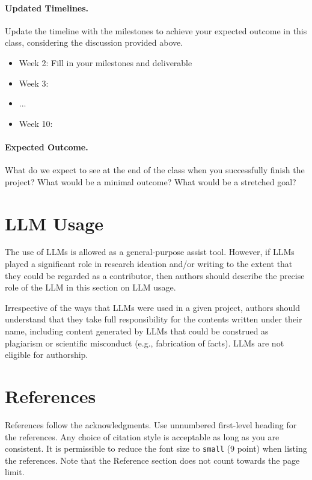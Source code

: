 \documentclass{article}
\newcommand{\new}[1]{{\color{red} #1}}
\begin{document}
\new{
\paragraph{Updated Timelines.}
Update the timeline with the milestones to achieve your expected outcome in this class, considering the discussion provided above.
\begin{itemize}
    \item Week 2: Fill in your milestones and deliverable
    \item Week 3:
    \item ...
    \item Week 10:
\end{itemize}

\paragraph{Expected Outcome.} What do we expect to see at the end of the class when you successfully finish the project?  What would be a minimal outcome? What would be a stretched goal?
}

\section{LLM Usage}
The use of LLMs is allowed as a general-purpose assist tool. However,  if LLMs played a significant role in research ideation and/or writing to the extent that they could be regarded as a contributor, then authors should describe the precise role of the LLM in this section on LLM usage. 

Irrespective of the ways that LLMs were used in a given project, authors should understand that they take full responsibility for the contents written under their name, including content generated by LLMs that could be construed as plagiarism or scientific misconduct (e.g., fabrication of facts).  LLMs are not eligible for authorship.

\section*{References}


References follow the acknowledgments. Use unnumbered first-level heading for
the references. Any choice of citation style is acceptable as long as you are
consistent. It is permissible to reduce the font size to \verb+small+ (9 point)
when listing the references.
Note that the Reference section does not count towards the page limit.
\medskip
\end{document}

